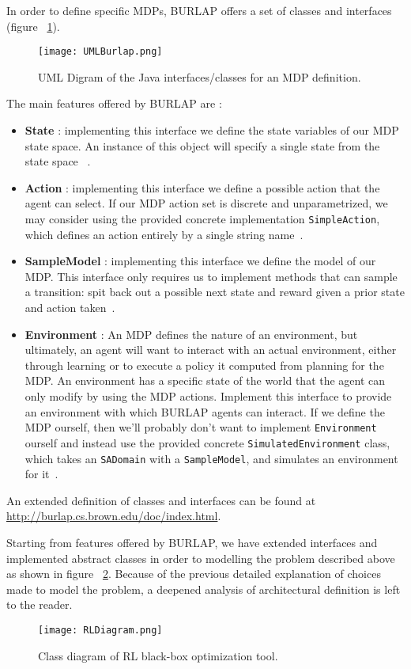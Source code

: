 In order to define specific MDPs, BURLAP offers a set of classes and interfaces (figure ~\ref{fig:UMLBurlap}).

\begin{figure} [h!]
	\texttt{[image: UMLBurlap.png]}
	\caption{UML Digram of the Java interfaces/classes for an MDP definition.}
	\label{fig:UMLBurlap}
\end{figure}

The main features offered by BURLAP are :
	
\begin{itemize}
	\item \textbf{State} : implementing this interface we define the state variables of our MDP state space. An instance of this object will specify a single state from the state space~\cite{BURLAPSite} .
	\item \textbf{Action} : implementing this interface we define a possible action that the agent can select. If our MDP action set is discrete and unparametrized, we may consider using the provided concrete implementation {\tt SimpleAction}, which defines an action entirely by a single string name~\cite{BURLAPSite}.
	\item \textbf{SampleModel} : implementing this interface we define the model of our MDP. This interface only requires us to implement methods that can sample a transition: spit back out a possible next state and reward given a prior state and action taken~\cite{BURLAPSite}.
	\item  \textbf{Environment} : An MDP defines the nature of an environment, but ultimately, an agent will want to interact with an actual environment, either through learning or to execute a policy it computed from planning for the MDP. An environment has a specific state of the world that the agent can only modify by using the MDP actions. Implement this interface to provide an environment with which BURLAP agents can interact. If we define the MDP ourself, then we'll probably don't want to implement {\tt Environment} ourself and instead use the provided concrete {\tt SimulatedEnvironment} class, which takes an {\tt SADomain} with a {\tt SampleModel}, and simulates an environment for it~\cite{BURLAPSite}.
\end{itemize}

An extended definition of classes and interfaces can be found at \url{http://burlap.cs.brown.edu/doc/index.html}.

Starting from features offered by BURLAP, we have extended interfaces and implemented abstract classes in order to modelling the problem described above as shown in figure ~\ref{fig:RLUMLDiagram}. Because of the previous detailed explanation of choices made to model the problem, a deepened analysis of architectural definition is left to the reader.

\begin{figure} [h!]
	\texttt{[image: RLDiagram.png]}
	\caption{Class diagram of RL black-box optimization tool.}
	\label{fig:RLUMLDiagram}
\end{figure}